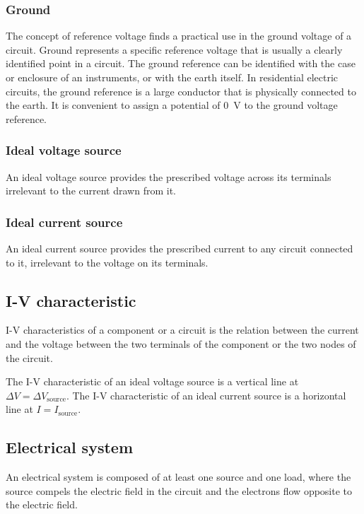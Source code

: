\documentclass[10pt, twocolumn]{article}
\begin{document}
\subsubsection{Ground}
The concept of reference voltage finds a practical use in the ground voltage of a circuit.
Ground represents a specific reference voltage that is usually a clearly identified point in a circuit.
The ground reference can be identified with the case or enclosure of an instruments, or with the earth itself.
In residential electric circuits, the ground reference is a large conductor that is physically connected to the earth.
It is convenient to assign a potential of \SI{0}{\volt} to the ground voltage reference.


\subsubsection{Ideal voltage source}
An ideal voltage source provides the prescribed voltage across its terminals irrelevant to the current drawn from it.


\subsubsection{Ideal current source}
An ideal current source provides the prescribed current to any circuit connected to it, irrelevant to the voltage on its terminals.


\subsection{I-V characteristic}
I-V characteristics of a component or a circuit is the relation between the current and the voltage between the two terminals of the component or the two nodes of the circuit.

\begin{example}
  The I-V characteristic of an ideal voltage source is a vertical line at \(\Delta V = \Delta V_\mathrm{source}\).
  The I-V characteristic of an ideal current source is a horizontal line at \(I = I_\mathrm{source}\).
\end{example}


\subsection{Electrical system}
An electrical system is composed of at least one source and one load, where the source compels the electric field in the circuit and the electrons flow opposite to the electric field.
\end{document}
